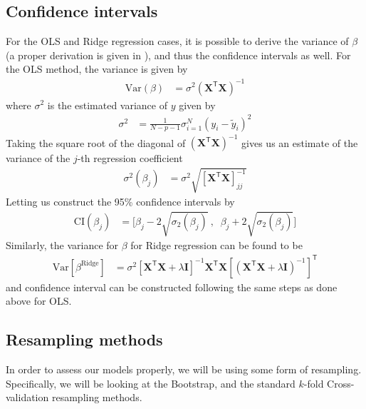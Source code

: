 \documentclass[a4paper]{article}
\newcommand{\XX}{\mathbf{X}}
\newcommand{\II}{\textbf{I}}
\newcommand{\T}{\mathsf{T}}
\begin{document}
\subsection{Confidence intervals}
For the OLS and Ridge regression cases, it is possible to derive the variance of $\beta$ (a proper derivation is given in \cite{vanwieringen2020lecture}), and thus the confidence intervals as well. For the OLS method, the variance is given by
\begin{align*}
	\text{Var}(\beta) &= \sigma^2(\XX^\T\XX)^{-1}
\end{align*}
where $\sigma^2$ is the estimated variance of $y$ given by %
\begin{align*}
	\sigma^2 &= \frac{1}{N-p-1}\sigma_{i=1}^N(y_i-\tilde y_i)^2
\end{align*}
Taking the square root of the diagonal of $(\XX^\T\XX)^{-1}$ gives us an estimate of the variance of the $j$-th regression coefficient
\begin{align*}
	\sigma^2(\beta_j) &= \sigma^2\sqrt{[\XX^\T\XX]^{-1}_{jj}}
\end{align*}
Letting us construct the 95\% confidence intervals by
\begin{align*}
	\text{CI}(\beta_j) &= \bigg[\beta_j - 2\sqrt{\sigma_2(\beta_j)}\:,\;\; \beta_j + 2\sqrt{\sigma_2(\beta_j)}\bigg]
\end{align*}
Similarly, the variance for $\beta$ for Ridge regression can be found to be
\begin{align*}
\text{Var}[\beta^{\text{Ridge}}] &= \sigma^2[\XX^\T\XX + \lambda\II]^{-1}
\XX^\T \XX[(\XX^\T \XX + \lambda \II)^{-1}]^\T
\end{align*}
and confidence interval can be constructed following the same steps as done above for OLS.%

\subsection{Resampling methods}
In order to assess our models properly, we will be using some form of resampling. Specifically, we will be looking at the Bootstrap, and the standard $k$-fold Cross-validation resampling methods.
\end{document}
